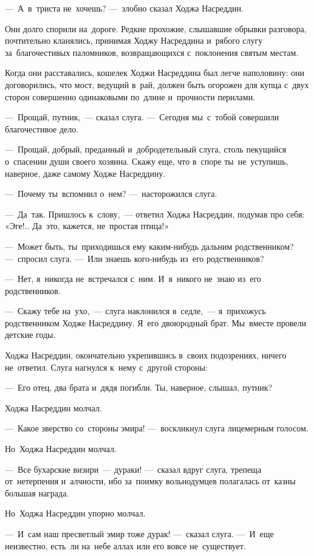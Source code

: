 \documentclass[12pt,a4paper]{book}
\begin{document}
—~А~в~триста не~хочешь? —~злобно сказал Ходжа Насреддин.

Они долго спорили на~дороге. Редкие прохожие, слышавшие обрывки разговора, почтительно кланялись, принимая Ходжу Насреддина и~рябого слугу за~благочестивых паломников, возвращающихся с~поклонения святым местам.

Когда они расставались, кошелек Ходжи Насреддина был легче наполовину: они договорились, что мост, ведущий в~рай, должен быть огорожен для купца с~двух сторон совершенно одинаковыми по~длине и~прочности перилами.

—~Прощай, путник,~— сказал слуга. —~Сегодня мы~с~тобой совершили благочестивое дело.

—~Прощай, добрый, преданный и~добродетельный слуга, столь пекущийся о~спасении души своего хозяина. Скажу еще, что в~споре ты~не~уступишь, наверное, даже самому Ходже Насреддину.

—~Почему ты~вспомнил о~нем? —~насторожился слуга.

—~Да~так. Пришлось к~слову,~— ответил Ходжа Насреддин, подумав про себя: «Эге!.. Да~это, кажется, не~простая птица!»

—~Может быть, ты~приходишься ему каким-нибудь дальним родственником? —~спросил слуга. —~Или знаешь кого-нибудь из~его родственников?

—~Нет, я~никогда не~встречался с~ним. И~я~никого не~знаю из~его родственников.

—~Скажу тебе на~ухо,~— слуга наклонился в~седле,~— я~прихожусь родственником Ходже Насреддину. Я~его двоюродный брат. Мы~вместе провели детские годы.

Ходжа Насреддин, окончательно укрепившись в~своих подозрениях, ничего не~ответил. Слуга нагнулся к~нему с~другой стороны:

—~Его отец, два брата и~дядя погибли. Ты, наверное, слышал, путник?

Ходжа Насреддин молчал.

—~Какое зверство со~стороны эмира! —~воскликнул слуга лицемерным голосом.

Но~Ходжа Насреддин молчал.

—~Все бухарские визири~— дураки! —~сказал вдруг слуга, трепеща от~нетерпения и~алчности, ибо за~поимку вольнодумцев полагалась от~казны большая награда.

Но~Ходжа Насреддин упорно молчал.

—~И~сам наш пресветлый эмир тоже дурак! —~сказал слуга. —~И~еще неизвестно, есть~ли на~небе аллах или его вовсе не~существует.
\end{document}
